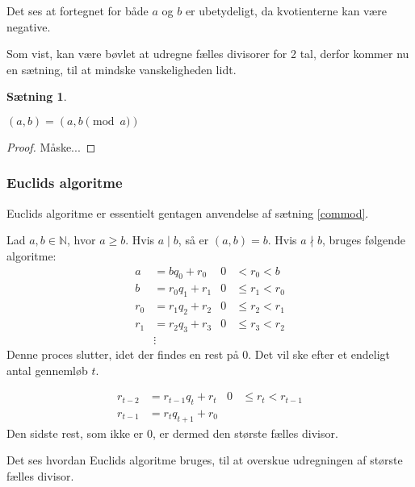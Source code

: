 \documentclass[a4paper, 12pt]{article}
\theoremstyle{break}
\theoremstyle{breakline}
\newtheorem{sentence}[definition]{Sætning}
\newenvironment{sent}
    {\begin{sentence}\mbox{}\begin{adjustwidth}{1em}{1em}}
    {\end{adjustwidth}\par\noindent\hrulefill\end{sentence}}
\begin{document}
    Det ses at fortegnet for både \(a\) og \(b\) er ubetydeligt, da kvotienterne kan være negative.

    Som vist, kan være bøvlet at udregne fælles divisorer for 2 tal, derfor kommer nu en sætning, til at mindske vanskeligheden lidt.

    \begin{sent}
        \label{commod}
        \((a, b) = (a, b \pmod{a})\)
    \end{sent}

    \begin{proof}
        Måske...
    \end{proof}


    \subsubsection{Euclids algoritme}
    Euclids algoritme er essentielt gentagen anvendelse af sætning \ref{commod}.
    \begin{definition}
        Lad \(a, b \in \mathbb{N}\), hvor \(a \geq b\).
        Hvis \(a \mid b\), så er \((a, b) = b\).
        Hvis \(a \nmid b\), bruges følgende algoritme:
        \begin{align*}
            a   &= b q_0    + r_0   & 0 &<    r_0 < b\\
            b   &= r_0 q_1  + r_1   & 0 &\leq r_1 < r_0\\
            r_0 &= r_1 q_2  + r_2   & 0 &\leq r_2 < r_1\\
            r_1 &= r_2 q_3  + r_3   & 0 &\leq r_3 < r_2\\
            &\vdots
        \end{align*}
        Denne proces slutter, idet der findes en rest på 0.
        Det vil ske efter et endeligt antal gennemløb \(t\).

        \begin{align*}
            r_{t-2} &= r_{t-1}  q_t      + r_t   & 0 &\leq r_t < r_{t-1}\\
            r_{t-1} &= r_t      q_{t+1}  + r_0
        \end{align*}
        Den sidste rest, som ikke er 0, er dermed den største fælles divisor.\cite[11]{absalg}
    \end{definition}

    Det ses hvordan Euclids algoritme bruges, til at overskue udregningen af største fælles divisor.
\end{document}
